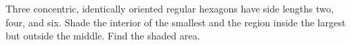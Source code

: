 Three concentric, identically oriented regular hexagons have side lengths two, four, and six. Shade the interior of the smallest and the region inside the largest but outside the middle. Find the shaded area.
